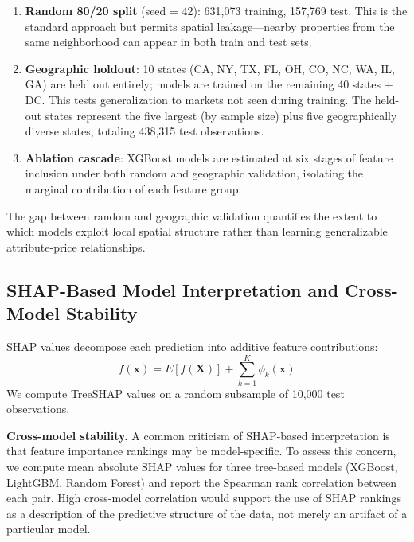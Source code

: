 \begin{enumerate}[nosep]
    \item \textbf{Random 80/20 split} (seed = 42): 631,073 training, 157,769 test. This is the standard approach but permits spatial leakage---nearby properties from the same neighborhood can appear in both train and test sets.
    \item \textbf{Geographic holdout}: 10 states (CA, NY, TX, FL, OH, CO, NC, WA, IL, GA) are held out entirely; models are trained on the remaining 40 states + DC. This tests generalization to markets not seen during training. The held-out states represent the five largest (by sample size) plus five geographically diverse states, totaling 438,315 test observations.
    \item \textbf{Ablation cascade}: XGBoost models are estimated at six stages of feature inclusion under both random and geographic validation, isolating the marginal contribution of each feature group.
\end{enumerate}

The gap between random and geographic validation quantifies the extent to which models exploit local spatial structure rather than learning generalizable attribute-price relationships.

\subsection{SHAP-Based Model Interpretation and Cross-Model Stability}
\label{sec:shap_methodology}

SHAP values \citep{lundberg2017unified} decompose each prediction into additive feature contributions:
\begin{equation}
    f(\mathbf{x}) = E[f(\mathbf{X})] + \sum_{k=1}^{K} \phi_k(\mathbf{x})
\end{equation}
We compute TreeSHAP values on a random subsample of 10,000 test observations.

\textbf{Cross-model stability.} A common criticism of SHAP-based interpretation is that feature importance rankings may be model-specific. To assess this concern, we compute mean absolute SHAP values for three tree-based models (XGBoost, LightGBM, Random Forest) and report the Spearman rank correlation between each pair. High cross-model correlation would support the use of SHAP rankings as a description of the predictive structure of the data, not merely an artifact of a particular model.

